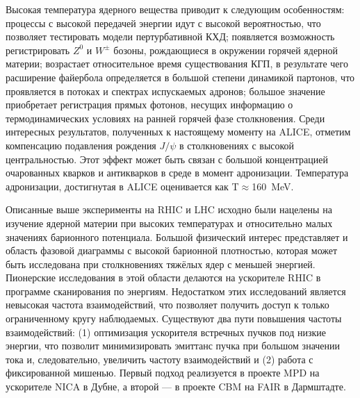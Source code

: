 Высокая температура ядерного вещества приводит к следующим особенностям: процессы с высокой передачей энергии идут с высокой вероятностью, что позволяет тестировать модели пертурбативной КХД; появляется возможность регистрировать $Z^{0}$ и $W^{\pm}$ бозоны, рождающиеся в окружении горячей ядерной материи; возрастает относительное время существования КГП, в результате чего расширение файербола определяется в большой степени динамикой партонов, что проявляется в потоках и спектрах испускаемых адронов; большое значение приобретает регистрация прямых фотонов, несущих информацию о термодинамических условиях на ранней горячей фазе столкновения. Среди интересных результатов, полученных к настоящему моменту на ALICE, отметим компенсацию подавления рождения $J/\psi$ в столкновениях с высокой центральностью. Этот эффект может быть связан с большой концентрацией очарованных кварков и антикварков в среде в момент адронизации. Температура адронизации, достигнутая в ALICE оценивается как T$\approx$160~MeV.

\bigskip

%


Описанные выше эксперименты на RHIC и LHC исходно были нацелены на изучение ядерной материи при высоких температурах и относительно малых значениях барионного потенциала. Большой физический интерес представляет и область фазовой диаграммы с высокой барионной плотностью, которая может быть исследована при столкновениях тяжёлых ядер с меньшей энергией. Пионерские исследования в этой области делаются на ускорителе RHIC в программе сканирования по энергиям. Недостатком этих исследований является невысокая частота взаимодействий, что позволяет получить доступ к только ограниченному кругу наблюдаемых. Существуют два пути повышения частоты взаимодействий: (1) оптимизация ускорителя встречных пучков под низкие энергии, что позволит минимизировать эмиттанс пучка при большом значении тока и, следовательно, увеличить частоту взаимодействий и (2) работа с фиксированной мишенью. Первый подход реализуется в проекте MPD на ускорителе NICA в Дубне, а второй --- в проекте CBM на FAIR в Дармштадте.

\bigskip


